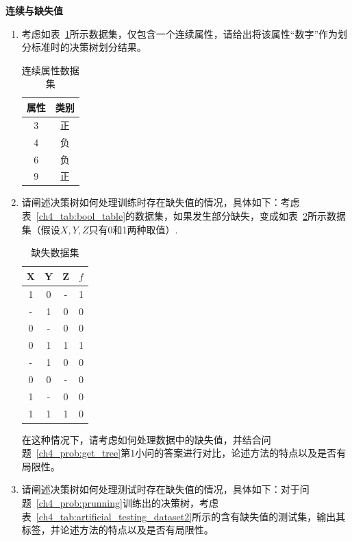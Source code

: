 \documentclass[answers]{exam}  %
\begin{document}
\begin{questions}
	\begin{solution}
	\end{solution}

\question [20] \textbf{连续与缺失值}



\begin{enumerate}
	\item 
    考虑如表~\ref{ch4_tab:continuous_small_dataset}所示数据集，仅包含一个连续属性，请给出将该属性“数字”作为划分标准时的决策树划分结果。
    \begin{table}[h]
    \begin{center}
    \begin{tabular}{cc}
    \hline 属性 & 类别 \\
    \hline 3 & 正 \\
    4 & 负 \\
    6 & 负 \\
    9 & 正 \\
    \hline
    \end{tabular}
    \caption{连续属性数据集}\label{ch4_tab:continuous_small_dataset}
    \end{center}
    \end{table}
	\item 请阐述决策树如何处理训练时存在缺失值的情况，具体如下：考虑表~\ref{ch4_tab:bool_table}的数据集，如果发生部分缺失，变成如表~\ref{ch4_tab:missing_dataset}所示数据集（假设$X, Y, Z$只有0和1两种取值）.
    \begin{table}[ht]
    \centering
    \caption{缺失数据集}\label{ch4_tab:missing_dataset}
    \begin{tabular}{ccc|c}
        \hline X & Y & Z & $f$ \\
        \hline 
        1 & 0 & - & 1\\
        - & 1 & 0 & 0\\
        0 & - & 0 & 0\\
        0 & 1 & 1 & 1\\
        - & 1 & 0 & 0\\
        0 & 0 & - & 0\\
        1 & - & 0 & 0\\
        1 & 1 & 1 & 0\\
        \hline
    \end{tabular}
\end{table}
    在这种情况下，请考虑如何处理数据中的缺失值，并结合问题~\ref{ch4_prob:get_tree}第1小问的答案进行对比，论述方法的特点以及是否有局限性。
	\item 请阐述决策树如何处理测试时存在缺失值的情况，具体如下：对于问题~\ref{ch4_prob:prunning}训练出的决策树，考虑表~\ref{ch4_tab:artificial_testing_dataset2}所示的含有缺失值的测试集，输出其标签，并论述方法的特点以及是否有局限性。

\end{enumerate}
\end{questions}
\end{document}
